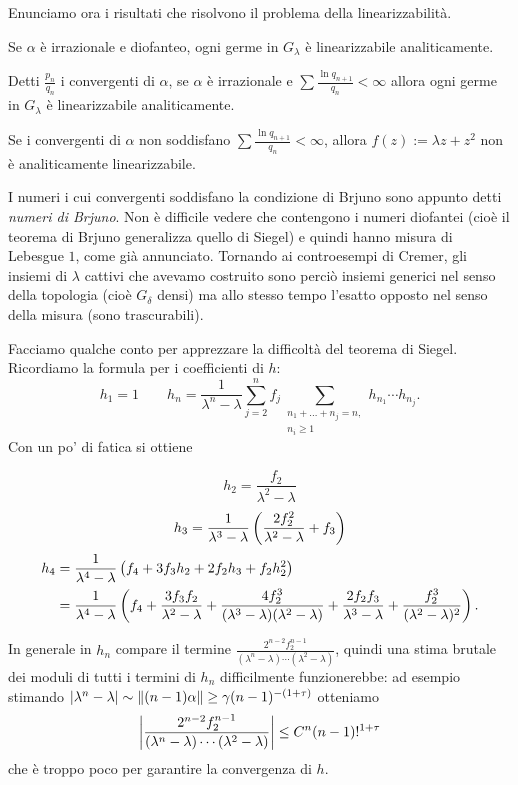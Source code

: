 Enunciamo ora i risultati che risolvono il problema della linearizzabilità.

\begin{teo}[Siegel] Se $\alpha$ è irrazionale e diofanteo, ogni germe in $G_\lambda$ è linearizzabile analiticamente.\end{teo}

\begin{teo}[Brjuno] Detti $\frac{p_n}{q_n}$ i convergenti di $\alpha$, se $\alpha$ è irrazionale
e $\sum\frac{\ln q_{n+1}}{q_n}<\infty$ allora ogni germe in $G_\lambda$ è linearizzabile analiticamente.
\end{teo}

\begin{teo}[Yoccoz] Se i convergenti di $\alpha$ non soddisfano $\sum\frac{\ln q_{n+1}}{q_n}<\infty$, allora $f(z):=\lambda z+z^2$ non è analiticamente linearizzabile.\end{teo}

I numeri i cui convergenti soddisfano la condizione di Brjuno sono appunto detti \emph{numeri di Brjuno}. Non è difficile vedere che contengono i numeri diofantei (cioè il teorema di Brjuno generalizza quello di Siegel) e quindi hanno misura di Lebesgue $1$, come già annunciato. Tornando ai controesempi di Cremer, gli insiemi di $\lambda$ cattivi che avevamo costruito sono perciò insiemi generici nel senso della topologia (cioè $G_\delta$ densi) ma allo stesso tempo l'esatto opposto nel senso della misura (sono trascurabili). 

Facciamo qualche conto per apprezzare la difficoltà del teorema di Siegel. Ricordiamo la formula per i coefficienti di $h$:
\[ h_1=1 \qquad h_n=\frac{1}{\lambda^n-\lambda}\sum_{j=2}^n f_j\sum_{\substack{n_1+\dots+n_j=n,\\n_i\ge 1}}h_{n_1}\cdots h_{n_j}. \]
Con un po' di fatica si ottiene 

\[h_2=\frac{f_2}{\lambda^2-\lambda}\]
\[h_3=\frac{1}{\lambda^3-\lambda}\left(\frac{2f_2^2}{\lambda^2-\lambda}+f_3\right)\]
\[\begin{split}
   h_4 &=\frac{1}{\lambda^4-\lambda}\left(f_4+3f_3h_2+2f_2h_3+f_2h_2^2\right) \\
       &=\frac{1}{\lambda^4-\lambda}\left(f_4+\frac{3f_3f_2}{\lambda^2-\lambda}+\frac{4f_2^3}{(\lambda^3-\lambda)(\lambda^2-\lambda)} +\frac{2f_2f_3}{\lambda^3-\lambda}+\frac{f_2^3}{(\lambda^2-\lambda)^2}\right).
  \end{split}\]

In generale in $h_n$ compare il termine $\frac{2^{n-2}f_2^{n-1}}{(\lambda^n-\lambda)\cdots(\lambda^2-\lambda)}$,
quindi una stima brutale dei moduli di tutti i termini di $h_n$ difficilmente funzionerebbe: ad esempio stimando
$\left|\lambda^n-\lambda\right|\sim\left\|(n-1)\alpha\right\|\ge\gamma(n-1)^{-(1+\tau)}$ otteniamo
\[ \left|\frac{2^{n-2}f_2^{n-1}}{(\lambda^n-\lambda)\cdots(\lambda^2-\lambda)}\right|\le C^n (n-1)!^{1+\tau} \]
che è troppo poco per garantire la convergenza di $h$.

